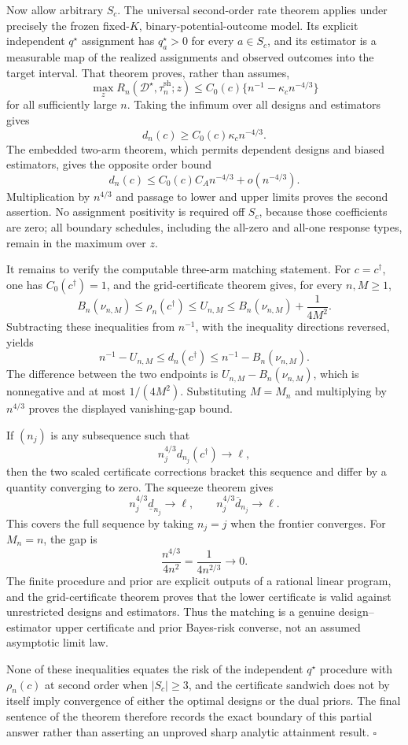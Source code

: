 Now allow arbitrary \(S_c\).  The universal second-order rate theorem applies under precisely the frozen fixed-\(K\), binary-potential-outcome model.  Its explicit independent \(q^\star\) assignment has \(q_a^\star>0\) for every \(a\in S_c\), and its estimator is a measurable map of the realized assignments and observed outcomes into the target interval.  That theorem proves, rather than assumes,
\[
 \max_z R_n(\mathcal D^\star,\widehat\tau_n^{\mathrm{sh}};z)
 \leq C_0(c)\{n^{-1}-\kappa_c n^{-4/3}\}
\]
for all sufficiently large \(n\).  Taking the infimum over all designs and estimators gives
\[
 d_n(c)\geq C_0(c)\kappa_c n^{-4/3}.
\]
The embedded two-arm theorem, which permits dependent designs and biased estimators, gives the opposite order bound
\[
 d_n(c)\leq C_0(c)C_A n^{-4/3}+o(n^{-4/3}).
\]
Multiplication by \(n^{4/3}\) and passage to lower and upper limits proves the second assertion.  No assignment positivity is required off \(S_c\), because those coefficients are zero; all boundary schedules, including the all-zero and all-one response types, remain in the maximum over \(z\).

It remains to verify the computable three-arm matching statement.  For \(c=c^\dagger\), one has \(C_0(c^\dagger)=1\), and the grid-certificate theorem gives, for every \(n,M\geq1\),
\[
 B_n(\nu_{n,M})\leq\rho_n(c^\dagger)\leq U_{n,M}
 \leq B_n(\nu_{n,M})+\frac{1}{4M^2}.
\]
Subtracting these inequalities from \(n^{-1}\), with the inequality directions reversed, yields
\[
 n^{-1}-U_{n,M}
 \leq d_n(c^\dagger)
 \leq n^{-1}-B_n(\nu_{n,M}).
\]
The difference between the two endpoints is \(U_{n,M}-B_n(\nu_{n,M})\), which is nonnegative and at most \(1/(4M^2)\).  Substituting \(M=M_n\) and multiplying by \(n^{4/3}\) proves the displayed vanishing-gap bound.

If \((n_j)\) is any subsequence such that
\[
 n_j^{4/3}d_{n_j}(c^\dagger)\longrightarrow \ell,
\]
then the two scaled certificate corrections bracket this sequence and differ by a quantity converging to zero.  The squeeze theorem gives
\[
 n_j^{4/3}\underline d_{n_j}\longrightarrow\ell,
 \qquad
 n_j^{4/3}\overline d_{n_j}\longrightarrow\ell.
\]
This covers the full sequence by taking \(n_j=j\) when the frontier converges.  For \(M_n=n\), the gap is
\[
 \frac{n^{4/3}}{4n^2}=\frac{1}{4n^{2/3}}\longrightarrow0.
\]
The finite procedure and prior are explicit outputs of a rational linear program, and the grid-certificate theorem proves that the lower certificate is valid against unrestricted designs and estimators.  Thus the matching is a genuine design--estimator upper certificate and prior Bayes-risk converse, not an assumed asymptotic limit law.

None of these inequalities equates the risk of the independent \(q^\star\) procedure with \(\rho_n(c)\) at second order when \(|S_c|\geq3\), and the certificate sandwich does not by itself imply convergence of either the optimal designs or the dual priors.  The final sentence of the theorem therefore records the exact boundary of this partial answer rather than asserting an unproved sharp analytic attainment result. \(\square\)